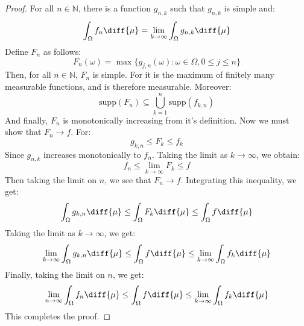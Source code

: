     \begin{proof}
        For all $n\in\mathbb{N}$, there is a function
        $g_{n,k}$ such that $g_{n,k}$ is simple and:
        \begin{equation}
            \int_{\Omega}f_{n}\diff{\mu}=
            \underset{k\rightarrow\infty}{\lim}
            \int_{\Omega}g_{n,k}\diff{\mu}
        \end{equation}
        Define $F_{n}$ as follows:
        \begin{equation}
            F_{n}(\omega)=
            \max\{g_{j,n}(\omega):
                \omega\in\Omega,0\leq{j}\leq{n}\}
        \end{equation}
        Then, for all $n\in\mathbb{N}$, $F_{n}$ is simple.
        For it is the maximum of finitely many measurable
        functions, and is therefore measurable. Moreover:
        \begin{equation}
            \mathrm{supp}(F_{n})\subseteq
            \bigcup_{k=1}^{n}\mathrm{supp}(f_{k,n})
        \end{equation}
        And finally, $F_{n}$ is monotonically increasing from
        it's definition. Now we must show that
        $F_{n}\rightarrow{f}$. For:
        \begin{equation}
            g_{k,n}\leq{F}_{k}\leq{f}_{k}
        \end{equation}
        Since $g_{n,k}$ increases monotonically to $f_{n}$.
        Taking the limit as $k\rightarrow\infty$, we obtain:
        \begin{equation}
            f_{n}\leq\underset{k\rightarrow\infty}{\lim}F_{k}
            \leq{f}
        \end{equation}
        Then taking the limit on $n$, we see that
        $F_{n}\rightarrow{f}$. Integrating this inequality, we
        get:
        \begin{equation}
            \int_{\Omega}g_{k,n}\diff{\mu}
            \leq\int_{\Omega}F_{k}\diff{\mu}
            \leq\int_{\Omega}f\diff{\mu}
        \end{equation}
        Taking the limit as $k\rightarrow\infty$, we get:
        \begin{equation}
            \underset{k\rightarrow\infty}{\lim}
            \int_{\Omega}g_{k,n}\diff{\mu}
            \leq\int_{\Omega}f\diff{\mu}
            \leq\underset{k\rightarrow\infty}{\lim}
            \int_{\Omega}f_{k}\diff{\mu}
        \end{equation}
        Finally, taking the limit on $n$, we get:
        \begin{equation}
            \underset{n\rightarrow\infty}{\lim}
            \int_{\Omega}f_{n}\diff{\mu}
            \leq\int_{\Omega}f\diff{\mu}
            \leq\underset{k\rightarrow\infty}{\lim}
            \int_{\Omega}f_{k}\diff{\mu}
        \end{equation}
        This completes the proof.
    \end{proof}